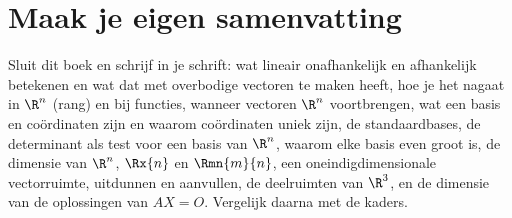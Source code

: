 

\begin{oefeningen}


\end{oefeningen}


\begin{oefeningen}






\end{oefeningen}


\ifzelfstudie
\section*{Maak je eigen samenvatting}
Sluit dit boek en schrijf in je schrift: wat lineair onafhankelijk en afhankelijk betekenen en wat dat met overbodige vectoren te maken heeft, hoe je het nagaat in $\R^n$ (rang) en bij functies, wanneer vectoren $\R^n$ voortbrengen, wat een basis en coördinaten zijn en waarom coördinaten uniek zijn, de standaardbases, de determinant als test voor een basis van $\R^n$, waarom elke basis even groot is, de dimensie van $\R^n$, $\Rx{n}$ en $\Rmn{m}{n}$, een oneindigdimensionale vectorruimte, uitdunnen en aanvullen, de deelruimten van $\R^3$, en de dimensie van de oplossingen van $AX = O$. Vergelijk daarna met de kaders.
\fi
